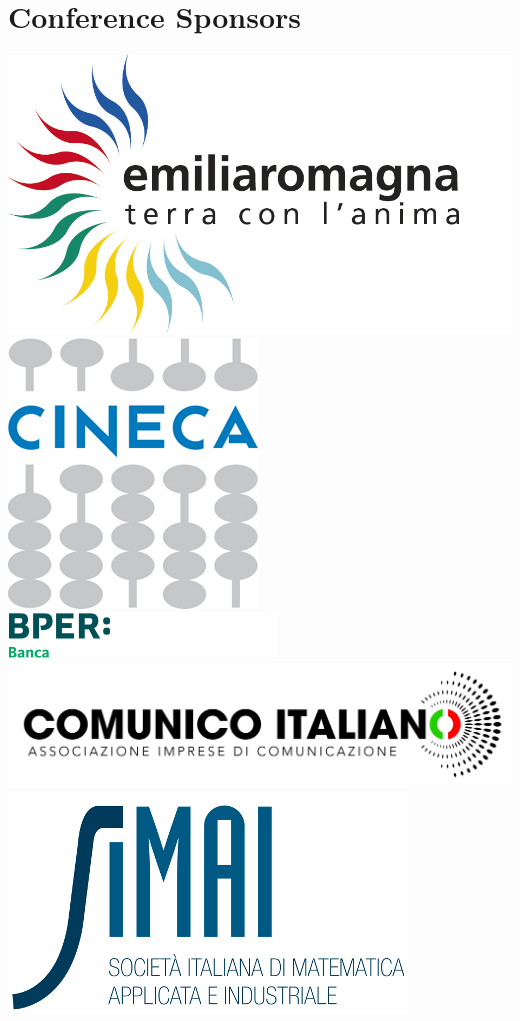 \section*{Conference Sponsors}
\includegraphics[scale=0.25]{images/logo_APT}
\includegraphics[scale=0.4]{images/logo_CINECA}\\
\includegraphics[scale=0.5]{images/logo_BPER}
\includegraphics[scale=0.4]{images/logo_TIPO}\\
\includegraphics[scale=0.5]{images/logo_SIMAI}
